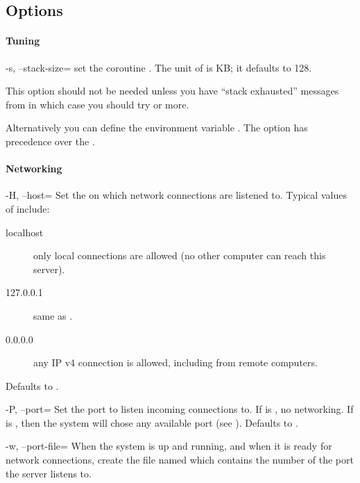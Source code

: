 \subsection{Options}

\paragraph{Tuning}
\begin{options}
\item[-s, --stack-size=\var{size}] set the coroutine .
  The unit of  is KB; it defaults to 128.

  This option should not be needed unless you have ``stack exhausted''
  messages from  in which case you should try
   or more.

  Alternatively you can define the environment variable
  .  The option  has
  precedence over the .
\end{options}

\paragraph{Networking}
\begin{options}
\item[-H, --host=\var{address}] Set the  on which network
  connections are listened to.  Typical values of 
  include:
  \begin{description}
  \item[localhost] only local connections are allowed (no other
    computer can reach this server).
  \item[127.0.0.1] same as .
  \item[0.0.0.0] any IP v4 connection is allowed, including from
    remote computers.
  \end{description}
  Defaults to .
\item[-P, --port=\var{port}] Set the port to listen incoming
  connections to.  If  is , no networking.  If
   is , then the system will chose any available
  port (see ).  Defaults to .
\item[-w, --port-file=\var{file}] When the system is up and running,
  and when it is ready for network connections, create the file named
   which contains the number of the port the server listens
  to.
\end{options}


